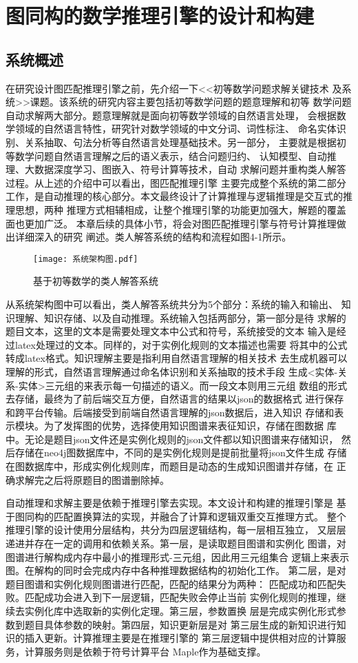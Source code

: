 \documentclass{standalone}
\begin{document}
\chapter{图同构的数学推理引擎的设计和构建}
\section{系统概述}
在研究设计图匹配推理引擎之前，先介绍一下<<初等数学问题求解关键技术
及系统>>课题。该系统的研究内容主要包括初等数学问题的题意理解和初等
数学问题自动求解两大部分。题意理解就是面向初等数学领域的自然语言处理，
会根据数学领域的自然语言特性，研究针对数学领域的中文分词、词性标注、
命名实体识别、关系抽取、句法分析等自然语言处理基础技术。另一部分，
主要就是根据初等数学问题自然语言理解之后的语义表示，结合问题归约、
认知模型、自动推理、大数据深度学习、图嵌入、符号计算等技术，自动
求解问题并重构类人解答过程。从上述的介绍中可以看出，图匹配推理引擎
主要完成整个系统的第二部分工作，是自动推理的核心部分。本文最终设计了计算推理与逻辑推理是交互式的推理思想，两种
推理方式相辅相成，让整个推理引擎的功能更加强大，解题的覆盖面也更加广泛。
本章后续的具体小节，将会对图匹配推理引擎与符号计算推理做出详细深入的研究
阐述。类人解答系统的结构和流程如图4-1所示。

\begin{figure}[htbp]
	\texttt{[image: 系统架构图.pdf]}
	\caption{基于初等数学的类人解答系统}
	\label{系统架构图}
\end{figure}
从系统架构图中可以看出，类人解答系统共分为5个部分：系统的输入和输出、
知识理解、知识存储、以及自动推理。系统输入包括两部分，第一部分是待
求解的题目文本，这里的文本是需要处理文本中公式和符号，系统接受的文本
输入是经过latex处理过的文本。同样的，对于实例化规则的文本描述也需要
将其中的公式转成latex格式。知识理解主要是指利用自然语言理解的相关技术
去生成机器可以理解的形式，自然语言理解通过命名体识别和关系抽取的技术手段
生成<实体-关系-实体>三元组的来表示每一句描述的语义。而一段文本则用三元组
数组的形式去存储，最终为了前后端交互方便，自然语言的结果以json的数据格式
进行保存和跨平台传输。后端接受到前端自然语言理解的json数据后，进入知识
存储和表示模块。为了发挥图的优势，选择使用知识图谱来表征知识，存储在图数据
库中。无论是题目json文件还是实例化规则的json文件都以知识图谱来存储知识，
然后存储在neo4j图数据库中，不同的是实例化规则是提前批量将json文件生成
存储在图数据库中，形成实例化规则库，而题目是动态的生成知识图谱并存储，在
正确求解完之后将原题目的图谱删除掉。

自动推理和求解主要是依赖于推理引擎去实现。本文设计和构建的推理引擎是
基于图同构的匹配置换算法的实现，并融合了计算和逻辑双重交互推理方式。
整个推理引擎的设计使用分层结构，共分为四层逻辑结构，每一层相互独立，
又层层递进并存在一定的调用和依赖关系。第一层，是读取题目图谱和实例化
图谱，对图谱进行解构成内存中最小的推理形式-三元组，因此用三元组集合
逻辑上来表示图。在解构的同时会完成内存中各种推理数据结构的初始化工作。
第二层，是对题目图谱和实例化规则图谱进行匹配，匹配的结果分为两种：
匹配成功和匹配失败。匹配成功会进入到下一层逻辑，匹配失败会停止当前
实例化规则的推理，继续去实例化库中选取新的实例化定理。第三层，参数置换
层是完成实例化形式参数到题目具体参数的映射。第四层，知识更新层是对
第三层生成的新知识进行知识的插入更新。计算推理主要是在推理引擎的
第三层逻辑中提供相对应的计算服务，计算服务则是依赖于符号计算平台
Maple作为基础支撑。
\end{document}
